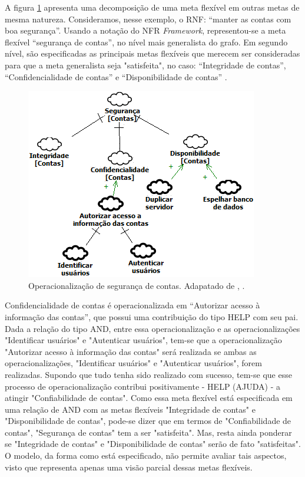 \pagebreak

A figura \ref{exemploNFR} apresenta uma decomposição de uma meta flexível em outras metas de mesma natureza. Consideramos, nesse exemplo, o RNF: “manter as contas com boa segurança”. Usando a notação do NFR \textit{Framework}, representou-se a meta flexível  “segurança de contas”, no nível mais generalista do grafo. Em segundo nível, são especificadas as principais metas flexíveis que merecem ser consideradas para que a meta generalista seja "satisfeita", no caso: “Integridade de contas”, “Confidencialidade de contas” e “Disponibilidade de contas” \cite{chung2012non}.

\begin{figure}[h!]
	\centering
	\includegraphics[keepaspectratio=true,scale=1.0]{figuras/exemploNFR.png}
	\caption{Operacionalização de segurança de contas. Adapatado de \cite{chung2012non}, \cite{affleck2012supporting}.}
	\label{exemploNFR}
\end{figure} 

Confidencialidade de contas é operacionalizada em “Autorizar acesso à informação das contas”, que possui uma contribuição do tipo HELP com seu pai. Dada a relação do tipo AND, entre essa operacionalização e as operacionalizações "Identificar usuários" e "Autenticar usuários", tem-se que a operacionalização "Autorizar acesso à informação das contas"  será realizada se ambas as operacionalizações, "Identificar usuários" e "Autenticar usuários", forem realizadas. Supondo que tudo tenha sido realizado com sucesso, tem-se que esse processo de operacionalização contribui positivamente - HELP (AJUDA) - a atingir "Confiabilidade de contas". Como essa meta flexível está especificada em uma relação de AND com as metas flexíveis "Integridade de contas" e "Disponibilidade de contas", pode-se dizer que em termos de "Confiabilidade de contas", "Segurança de contas" tem a ser "satisfeita". Mas, resta ainda ponderar se "Integridade de contas" e "Disponibilidade de contas" serão de fato "satisfeitas". O modelo, da forma como está especificado, não permite avaliar tais aspectos, visto que representa apenas uma visão parcial dessas metas flexíveis.


